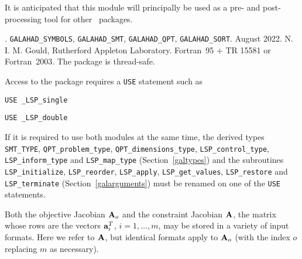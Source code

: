 \documentclass{galahad}
\newcommand{\packagename}{LSP}
\newcommand{\fullpackagename}{\libraryname\_\packagename}
\begin{document}
It is anticipated that this module will principally be used as a pre- and
post-processing tool for other \galahad\ packages.


\galattributes
\galversions{\tt  \fullpackagename\_single, \fullpackagename\_double}.
\galuses
{\tt GALAHAD\_SY\-M\-BOLS},
{\tt GALAHAD\_SMT},
{\tt GALAHAD\_QPT},
{\tt GALAHAD\_SORT}.
\galdate August 2022.
\galorigin N. I. M. Gould, Rutherford Appleton Laboratory.
\gallanguage Fortran~95 + TR 15581 or Fortran~2003.
The package is thread-safe.


\galhowto


Access to the package requires a {\tt USE} statement such as

\medskip{}

\hspace{8mm} {\tt USE \fullpackagename\_single}

\medskip{}

\hspace{8mm} {\tt USE  \fullpackagename\_double}

\medskip

\noindent
If it is required to use both modules at the same time, the derived types
{\tt SMT\_TYPE},
{\tt QPT\_problem\_type},
{\tt QPT\_dimensions\_type},
{\tt \packagename\_control\_type},
\sloppy
{\tt \packagename\_inform\_type}
and
{\tt \packagename\_map\_type}
(Section~\ref{galtypes})
and the subroutines
{\tt \packagename\_initialize},
{\tt \packagename\_reorder},
{\tt \packagename\_apply},
{\tt \packagename\_get\_values},
{\tt \packagename\_restore}
and
{\tt \packagename\_terminate}
(Section~\ref{galarguments})
must be renamed on one of the {\tt USE} statements.


\galmatrix

Both the objective Jacobian ${\mathbf{A}}_o$ and
the constraint Jacobian ${\mathbf{A}}$, the matrix
whose rows are the vectors ${\mathbf{a}}_{i}^{T}$, $i = 1, \ldots , m$,
may be stored in a variety of input formats. Here we refer to ${\mathbf{A}}$, but
identical formats apply to ${\mathbf{A}}_o$ (with the index $o$ replacing $m$ as
necessary).
\end{document}
